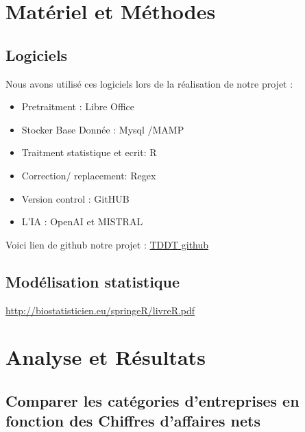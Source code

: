 \documentclass[mstat,12pt]{unswthesis}
\begin{document}
\chapter{Matériel et Méthodes}\label{matuxe9riel-et-muxe9thodes}

\section{Logiciels}\label{logiciels}

Nous avons utilisé ces logiciels lors de la réalisation de notre projet
:

\begin{itemize}
\tightlist
\item
  Pretraitment : Libre Office
\item
  Stocker Base Donnée : Mysql /MAMP
\item
  Traitment statistique et ecrit: R
\item
  Correction/ replacement: Regex
\item
  Version control : GitHUB
\item
  L'IA : OpenAI et MISTRAL
\end{itemize}

\bigskip

Voici lien de github notre projet :
\href{https://github.com/serdarvarl/Project_DataBase_FR.git}{TDDT github}

\section{Modélisation statistique}\label{moduxe9lisation-statistique}

\url{http://biostatisticien.eu/springeR/livreR.pdf}

\chapter{Analyse et Résultats}\label{analyse-et-ruxe9sultats}

\section{\texorpdfstring{\textbf{Comparer les catégories d'entreprises
en fonction des Chiffres d'affaires
nets}}{Comparer les catégories d'entreprises en fonction des Chiffres d'affaires nets}}\label{comparer-les-catuxe9gories-dentreprises-en-fonction-des-chiffres-daffaires-nets}

\bigskip
\end{document}
